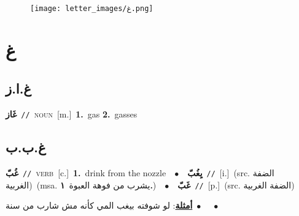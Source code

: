\documentclass[10pt,a4paper,twoside]{article} %
\begin{document}
\begin{figure*}[t!]\centering\texttt{[image: letter\_images/غ.png]}\end{figure*}
\color{white}

 \section*{\foreignlanguage{arabic}{غ}} 
 \begin{multicols}{2} 

%
\color{black}
\vspace{-3mm}
\subsection*{\color{blue}\foreignlanguage{arabic}{غ.ا.ز}\color{blue}{ (ntws)}} 

{\setlength\topsep{0pt}\textbf{\foreignlanguage{arabic}{غَاز}}\ {\color{gray}\texttt{//}\color{black}}\ \textsc{noun}\ [m.]\ \textbf{1.}~gas  \textbf{2.}~gasses\ 

\vspace{-3mm}
\subsection*{\color{blue}\foreignlanguage{arabic}{غ.ب.ب}\color{blue}{}} 

{\setlength\topsep{0pt}\textbf{\foreignlanguage{arabic}{غُبّ}}\ {\color{gray}\texttt{//}\color{black}}\ \textsc{verb}\ [c.]\ \textbf{1.}~drink from the nozzle\ \ $\bullet$\ \ \setlength\topsep{0pt}\textbf{\foreignlanguage{arabic}{يِغُبّ}}\ {\color{gray}\texttt{//}\color{black}}\ [i.]\ (src. \color{gray}\foreignlanguage{arabic}{الضفة الغربية}\color{black})\ \color{gray}(msa. \foreignlanguage{arabic}{يشرب من فوهة العبوة}~\foreignlanguage{arabic}{\textbf{١.}})\color{black}\ \ $\bullet$\ \ \setlength\topsep{0pt}\textbf{\foreignlanguage{arabic}{غَبّ}}\ {\color{gray}\texttt{//}\color{black}}\ [p.]\ (src. \color{gray}\foreignlanguage{arabic}{الضفة الغربية}\color{black})\  \begin{flushright}\color{gray}\foreignlanguage{arabic}{\textbf{\underline{\foreignlanguage{arabic}{أمثلة}}}: لو شوفته بيغب المي كأنه مش شارب من سنة\ $\bullet$\ \  \ $\bullet$\ \  }\end{flushright}\color{black}} \vspace{2mm}

}
\end{multicols}
\end{document}
